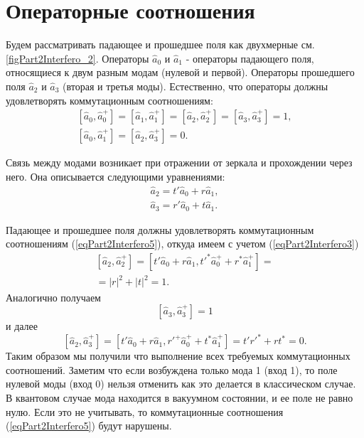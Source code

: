 \section{Операторные соотношения}
Будем рассматривать падающее и прошедшее поля как двухмерные
см. \autoref{figPart2Interfero_2}. Операторы $\hat{a}_0$ и 
$\hat{a}_1$ - операторы падающего поля, относящиеся к двум разным модам
(нулевой и первой). Операторы прошедшего поля $\hat{a}_2$ и 
$\hat{a}_3$ (вторая и третья моды). Естественно, что операторы должны
удовлетворять коммутационным соотношениям:
\begin{eqnarray}
\left[\hat{a}_0, \hat{a}_0^{+}\right] = 
\left[\hat{a}_1, \hat{a}_1^{+}\right] = 
\left[\hat{a}_2, \hat{a}_2^{+}\right] = 
\left[\hat{a}_3, \hat{a}_3^{+}\right] = 1,
\nonumber \\
\left[\hat{a}_0, \hat{a}_1^{+}\right] = 
\left[\hat{a}_2, \hat{a}_3^{+}\right] = 0.
\label{eqPart2Interfero5}
\end{eqnarray}



Связь между модами возникает при отражении от зеркала и прохождении
через него. Она описывается следующими уравнениями:
\begin{eqnarray}
\hat{a}_2 = t' \hat{a}_0 + r \hat{a}_1,
\nonumber \\
\hat{a}_3 = r' \hat{a}_0 + t \hat{a}_1.
\label{eqPart2Interfero6}
\end{eqnarray}

Падающее и прошедшее поля должны удовлетворять коммутационным
соотношениям (\ref{eqPart2Interfero5}), откуда имеем  с учетом 
(\ref{eqPart2Interfero3})
\begin{eqnarray}
\left[\hat{a}_2, \hat{a}_2^{+}\right] = 
\left[t' \hat{a}_0 + r \hat{a}_1, t'^{*} \hat{a}_0^{+} + r^{*}
  \hat{a}_1^{+}\right] =
\nonumber \\ = 
\left|r\right|^2 + \left|t\right|^2 = 1.
\label{eqPart2InterferoTask2a}
\end{eqnarray}
Аналогично получаем 
\begin{equation}
\left[\hat{a}_3, \hat{a}_3^{+}\right] = 1 
\label{eqPart2InterferoTask2b}
\end{equation}
и далее
\begin{equation}
\left[\hat{a}_2, \hat{a}_3^{+}\right] = 
\left[t' \hat{a}_0 + r \hat{a}_1, 
r'^{+} \hat{a}_0^{+} + t^{*} \hat{a}_1^{+}\right] = 
t' r'^{*} + r t^{*} = 0.
\label{eqPart2InterferoTask2c}
\end{equation}
Таким образом мы получили что выполнение всех требуемых коммутационных
соотношений. Заметим что если возбуждена только мода 1 (вход 1), то
поле нулевой моды (вход 0) нельзя отменить как это делается в
классическом случае. В квантовом случае мода находится в вакуумном
состоянии, и ее поле не равно нулю. Если это не учитывать, то
коммутационные соотношения (\ref{eqPart2Interfero5}) будут нарушены.

